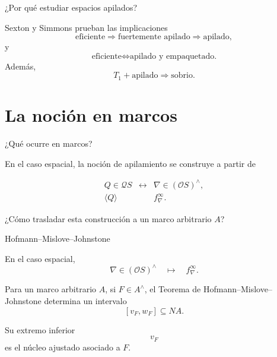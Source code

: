 \documentclass[compress,12pt]{beamer}
\begin{document}
\begin{frame}{¿Por qué estudiar espacios apilados?}

Sexton y Simmons prueban las implicaciones
\[
    \text{eficiente}
    \Longrightarrow
    \text{fuertemente apilado}
    \Longrightarrow
    \text{apilado},
\]
y
\[
\text{eficiente}\iff \text{apilado y empaquetado.}
\]
Además,
\[
    \boxed{
    T_1+\text{apilado}
    \Longrightarrow
    \text{sobrio}.
    }
\]
\end{frame}

\section{La noción en marcos}
\begin{frame}{¿Qué ocurre en marcos?}

En el caso espacial, la noción de apilamiento se construye a partir de

\[
\begin{array}{ccc}
Q\in\mathcal{Q}S
&\longleftrightarrow&
\nabla\in(\mathcal{O}S)^\wedge,
\\[3mm]
\langle Q\rangle
&&
f_\nabla^\infty.
\end{array}
\]

\vspace{0.4cm}

\begin{center}
\Large
¿Cómo trasladar esta construcción a un marco arbitrario \(A\)?
\end{center}

\end{frame}

\begin{frame}{Hofmann--Mislove--Johnstone}

En el caso espacial,
\[
    \nabla\in(\mathcal{O}S)^\wedge
    \quad\longmapsto\quad
    f_\nabla^\infty .
\]

Para un marco arbitrario \(A\), si \(F\in A^\wedge\),
el Teorema de Hofmann--Mislove--Johnstone determina
un intervalo
\[
    \boxed{
        [v_F,w_F]\subseteq NA
    }.
\]

Su extremo inferior
\[
    \boxed{v_F}
\]
es el núcleo ajustado asociado a \(F\).

\end{frame}
\end{document}
